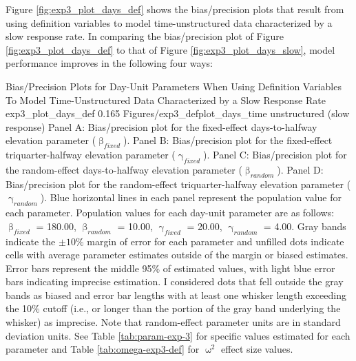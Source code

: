 \documentclass[
12pt, %
twoside,
english]{guelphthesis}
\begin{document}
Figure \ref{fig:exp3_plot_days_def} shows the bias/precision plots that result from using definition variables to model time-unstructured data characterized by a slow response rate. In comparing the bias/precision plot of Figure \ref{fig:exp3_plot_days_def} to that of Figure \ref{fig:exp3_plot_days_slow}, model performance improves in the following four ways:
\begin{apaFigure}
[portrait]
[samepage]
[-0.2cm]
{Bias/Precision Plots for Day-Unit Parameters When Using Definition Variables To Model Time-Unstructured Data Characterized by a Slow Response Rate}
{exp3_plot_days_def}
{0.165}
{Figures/exp3_defplot_days_time unstructured (slow response)}
{Panel A: Bias/precision plot for the fixed-effect days-to-halfway elevation parameter ($\upbeta_{fixed}$). Panel B: Bias/precision plot for the fixed-effect triquarter-halfway elevation parameter ($\upgamma_{fixed}$). Panel C: Bias/precision plot for the random-effect days-to-halfway elevation parameter ($\upbeta_{random}$). Panel D: Bias/precision plot for the random-effect triquarter-halfway elevation parameter ($\upgamma_{random}$). Blue horizontal lines in each panel represent the population value for each parameter. Population values for each day-unit parameter are as follows: $\upbeta_{fixed}$ = 180.00, $\upbeta_{random}$ = 10.00, $\upgamma_{fixed}$ = 20.00, $\upgamma_{random}$ = 4.00. Gray bands indicate the $\pm 10\%$ margin of error for each parameter and unfilled dots indicate cells with average parameter estimates outside of the margin or biased estimates. Error bars represent the middle 95\% of estimated values, with light blue error bars indicating imprecise estimation. I considered dots that fell outside the gray bands as biased and error bar lengths with at least one whisker length exceeding the 10\% cutoff (i.e., or longer than the portion of the gray band underlying the whisker) as imprecise. Note that random-effect parameter units are in standard deviation units. See Table \ref{tab:param-exp-3} for specific values estimated for each parameter and Table \ref{tab:omega-exp3-def} for $\upomega^2$ effect size values.}
\end{apaFigure}
\end{document}
